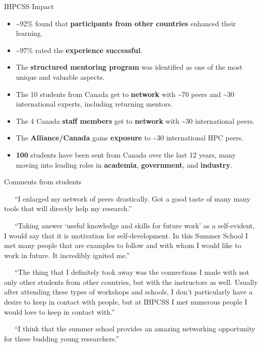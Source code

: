 \documentclass[
  11pt,
  ignorenonframetext,
  aspectratio=169]{beamer}
\begin{document}
\begin{frame}{IHPCSS Impact}
\label{ihpcss-impact}
\begin{itemize}
\item
  \textasciitilde92\% found that \textbf{\alert{participants from other countries}} enhanced their learning.

  \pause
\item
  \textasciitilde97\% rated the \textbf{\alert{experience successful}}.

  \pause
\item
  The \textbf{\alert{structured mentoring program}} was identified as one of the most unique and valuable aspects.

  \pause
\item
  The 10 students from Canada get to \textbf{\alert{network}} with \textasciitilde70 peers and \textasciitilde30 international experts, including returning mentors.

  \pause
\item
  The 4 Canada \textbf{\alert{staff members}} get to \textbf{\alert{network}} with \textasciitilde30 international peers.

  \pause
\item
  The \textbf{\alert{Alliance/Canada}} gains \textbf{\alert{exposure}} to \textasciitilde30 international HPC peers.

  \pause
\item
  \textbf{\alert{100}} students have been sent from Canada over the last 12 years, many moving into leading roles in \textbf{\alert{academia}}, \textbf{\alert{government}}, and \textbf{\alert{industry}}.
\end{itemize}

\vspace{\baselineskip} \vspace{\baselineskip}
\end{frame}

\begin{frame}{Comments from students}
\label{comments-from-students}
\small\it

~~~``I enlarged my network of peers drastically. Got a good taste of many many tools that will directly help my research.''

~~~``Taking answer `useful knowledge and skills for future work' as a self-evident, I would say that it is motivation for self-development. In this Summer School I met many people that are examples to follow and with whom I would like to work in future. It incredibly ignited me.''

~~~``The thing that I definitely took away was the connections I made with not only other students from other countries, but with the instructors as well. Usually after attending these types of workshops and schools, I don't particularly have a desire to keep in contact with people, but at IHPCSS I met numerous people I would love to keep in contact with.''

~~~``I think that the summer school provides an amazing networking opportunity for these budding young researchers.''
\end{frame}
\end{document}
